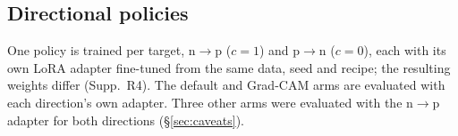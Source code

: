 \subsection{Directional policies}
\label{sec:directional-policies}

One policy is trained per target, n$\to$p ($c=1$) and p$\to$n ($c=0$), each with its own LoRA adapter fine-tuned from the same data, seed and recipe; the resulting weights differ (Supp.~R4). The default and Grad-CAM arms are evaluated with each direction's own adapter. Three other arms were evaluated with the n$\to$p adapter for both directions (\S\ref{sec:caveats}).
